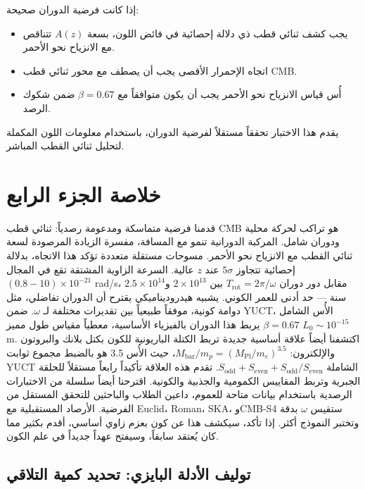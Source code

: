 \documentclass[12pt,a4paper]{article}
\begin{document}
	إذا كانت فرضية الدوران صحيحة:
	\begin{itemize}
		\item يجب كشف ثنائي قطب ذي دلالة إحصائية في فائض اللون، بسعة \(A(z)\) تتناقص مع الانزياح نحو الأحمر.
		\item اتجاه الإحمرار الأقصى يجب أن يصطف مع محور ثنائي قطب CMB.
		\item أُس قياس الانزياح نحو الأحمر يجب أن يكون متوافقاً مع \(\beta = 0.67\) ضمن شكوك الرصد.
	\end{itemize}
	
	يقدم هذا الاختبار تحققاً مستقلاً لفرضية الدوران، باستخدام معلومات اللون المكملة لتحليل ثنائي القطب المباشر.
	
	\section{خلاصة الجزء الرابع}
	
	قدمنا فرضية متماسكة ومدعومة رصدياً: ثنائي قطب CMB هو تراكب لحركة محلية ودوران شامل. المركبة الدورانية تنمو مع المسافة، مفسرة الزيادة المرصودة لسعة ثنائي القطب مع الانزياح نحو الأحمر. مسوحات مستقلة متعددة تؤكد هذا الاتجاه، بدلالة إحصائية تتجاوز \(5\sigma\) عند \(z\) عالية. السرعة الزاوية المشتقة تقع في المجال \((0.8-10)\times10^{-21}\) rad/s، مقابل دور دوران \(T_{\text{rot}} = 2\pi/\omega\) بين \(2\times10^{13}\) و\(2.5\times10^{14}\) سنة — حد أدنى للعمر الكوني. يشبيه هيدروديناميكي يقترح أن الدوران تفاضلي، مثل دوامة كونية، موفقاً طبيعياً بين تقديرات مختلفة لـ \(\omega\). ضمن YUCT، الأُس الشامل \(\beta = 0.67\) يربط هذا الدوران بالفيزياء الأساسية، معطياً مقياس طول مميز \(L_0 \sim 10^{-15}\) m. اكتشفنا أيضاً علاقة أساسية جديدة تربط الكتلة الباريونية للكون بكتل بلانك والبروتون والإلكترون: \(M_{\mathrm{bar}}/m_p = (M_{\mathrm{Pl}}/m_e)^{3.5}\)، حيث الأُس 3.5 هو بالضبط مجموع ثوابت YUCT الشاملة \(S_{\mathrm{odd}} + S_{\mathrm{even}} + S_{\mathrm{odd}}/S_{\mathrm{even}}\). تقدم هذه العلاقة تأكيداً رابعاً مستقلاً للحلقة الجبرية وتربط المقاييس الكمومية والجذبية والكونية. اقترحنا أيضاً سلسلة من الاختبارات الرصدية باستخدام بيانات متاحة للعموم، داعين الطلاب والباحثين للتحقق المستقل من الفرضية. الأرصاد المستقبلية مع Euclid، Roman، SKA، وCMB-S4 ستقيس \(\omega\) بدقة وتختبر النموذج أكثر. إذا تأكد، سيكشف هذا عن كون بعزم زاوي أساسي، أقدم بكثير مما كان يُعتقد سابقاً، وسيفتح عهداً جديداً في علم الكون.
	
	\subsection{توليف الأدلة البايزي: تحديد كمية التلاقي}
	
\end{document}
